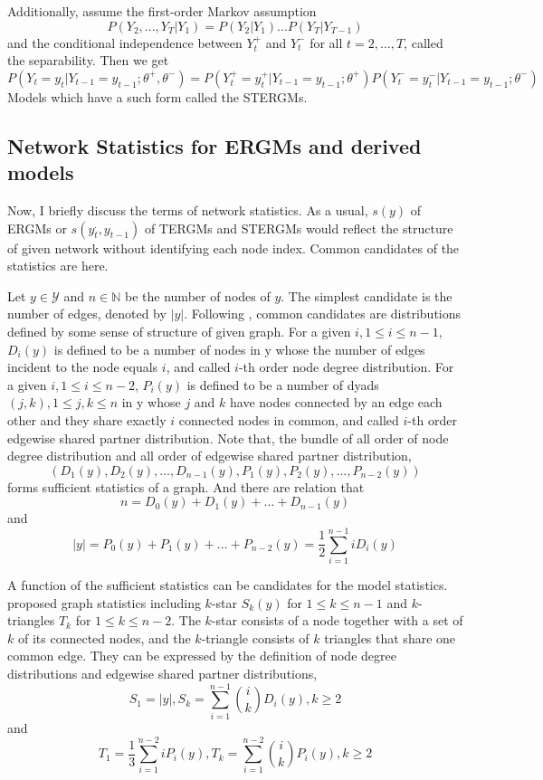 \documentclass[aspectratio=169,ignorenonframetext,9pt]{beamer}
\theoremstyle{plain}
\theoremstyle{definition}
\begin{document}
Additionally, assume the first-order Markov assumption
\[P(Y_2,...,Y_T|Y_1)=P(Y_2|Y_1)...P(Y_T|Y_{T-1})\]
and the conditional independence between $Y_t^+$ and $Y_t^-$ for all $t=2,...,T$, called the separability.
Then we get
\[P(Y_t=y_t|Y_{t-1}=y_{t-1};\theta^+,\theta^-)=P(Y_t^+=y_t^+|Y_{t-1}=y_{t-1};\theta^+) P(Y_t^-=y_t^-|Y_{t-1}=y_{t-1};\theta^-)\]
Models which have a such form called the STERGMs.



\subsection{Network Statistics for ERGMs and derived models}
Now, I briefly discuss the terms of network statistics.
As a usual, $s(y)$ of ERGMs or $s(y_{t}^.,y_{t-1})$ of TERGMs and STERGMs would 
reflect the structure of given network without identifying each node index.
Common candidates of the statistics are here.


Let $y\in\mathcal{Y}$ and $n\in\mathbb{N}$ be the number of nodes of $y$.
The simplest candidate is the number of edges, denoted by $|y|$.
Following \cite{RN104}, common candidates are distributions defined by some sense of structure of given graph.
For a given $i, 1\leq i \leq n-1$, $D_i(y)$ is defined to be a number of nodes in y whose the number of edges incident to the node equals $i$,
and called $i$-th order node degree distribution. 
For a given $i, 1\leq i \leq n-2$, $P_i(y)$ is defined to be a number of dyads $(j,k), 1\leq j,k \leq n$
in y whose $j$ and $k$ have nodes connected by an edge each other and they share exactly $i$ connected nodes in common,
and called $i$-th order edgewise shared partner distribution.
Note that, the bundle of all order of node degree distribution and all order of edgewise shared partner distribution,
\[(D_1(y),D_2(y),...,D_{n-1}(y),P_1(y),P_2(y),...,P_{n-2}(y))\] 
forms sufficient statistics of a graph.
And there are relation that
\[n=D_0(y)+D_1(y)+...+D_{n-1}(y)\]
and
\[|y|=P_0(y)+P_1(y)+...+P_{n-2}(y)=\frac{1}{2}\sum_{i=1}^{n-1} iD_i(y)\]


A function of the sufficient statistics can be candidates for the model statistics.
\cite{RN128} proposed graph statistics including $k$-star $S_k(y)$ for $1\leq k \leq n-1$ and $k$-triangles $T_k$ for $1\leq k \leq n-2$.
The $k$-star consists of a node together with a set of $k$ of its connected nodes,
and the $k$-triangle consists of $k$ triangles that share one common edge.
They can be expressed by the definition of node degree distributions and edgewise shared partner distributions,
\[S_1 = |y|, 
S_k = \sum_{i=1}^{n-1} \binom{i}{k} D_i(y), k\geq 2\]
and
\[T_1 = \frac{1}{3}\sum_{i=1}^{n-2} iP_i(y),
T_k = \sum_{i=1}^{n-2} \binom{i}{k} P_i(y), k\geq 2\]
\end{document}
